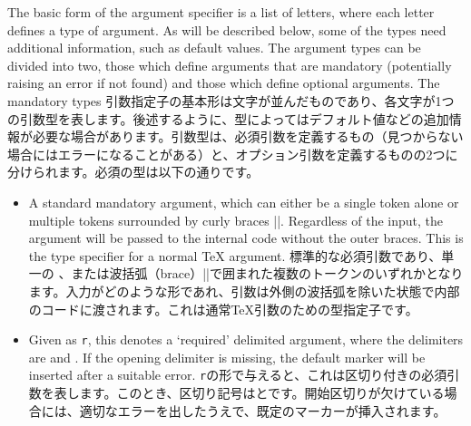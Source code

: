 \documentclass{ltxguide}
\newcommand\jpnewline{\vspace{3pt}\newline}
\begin{document}
The basic form of the argument specifier is a list of letters, where each
letter defines a type of argument. As will be described below, some of the
types need additional information, such as default values. The argument types
can be divided into two, those which define arguments that are mandatory
(potentially raising an error if not found) and those which define optional
arguments. The mandatory types
\jpnewline
引数指定子の基本形は文字が並んだものであり、各文字が1つの引数型を表します。後述するように、型によってはデフォルト値などの追加情報が必要な場合があります。引数型は、必須引数を定義するもの（見つからない場合にはエラーになることがある）と、オプション引数を定義するものの2つに分けられます。必須の型は以下の通りです。

\begin{itemize}
  \item[\texttt{m}] A standard mandatory argument, which can either be a single token
    alone or multiple tokens surrounded by curly braces |{}|. Regardless of the
    input, the argument will be passed to the internal code without the outer
    braces. This is the type specifier for a normal \TeX{} argument.
 \jpnewline   
        標準的な必須引数であり、単一の
、または波括弧（brace）|{}|で囲まれた複数のトークンのいずれかとなります。入力がどのような形であれ、引数は外側の波括弧を除いた状態で内部のコードに渡されます。これは通常\TeX{}引数のための型指定子です。  \item[\texttt{r}] Given as \texttt{r}, this denotes a
    `required' delimited argument, where the delimiters are
     and . If the opening delimiter  is
    missing, the default marker  will be inserted after a suitable
    error.  
 \jpnewline   
 \texttt{r}の形で与えると、これは区切り付きの必須引数を表します。このとき、区切り記号はとです。開始区切りが欠けている場合には、適切なエラーを出したうえで、既定のマーカーが挿入されます。
 

\end{itemize}
\end{document}
